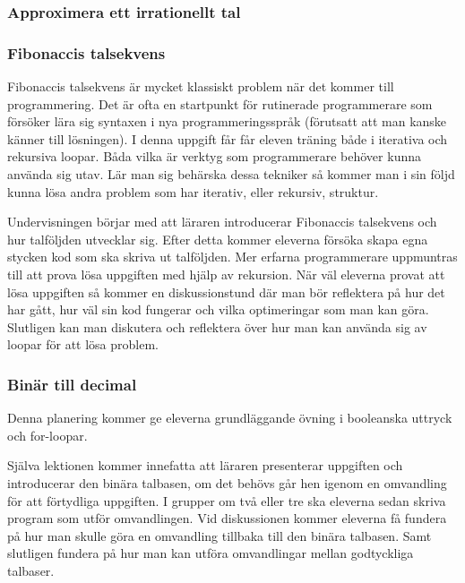         
\subsubsection{Approximera ett irrationellt tal}
    \label{sec:approx}

    
\subsubsection{Fibonaccis talsekvens}
    \label{sec:Fibonacci}
    
    \textcolor{WildStrawberry}{
        Fibonaccis talsekvens är mycket klassiskt problem när det kommer till programmering. Det är ofta en startpunkt för rutinerade programmerare som försöker lära sig syntaxen i nya programmeringsspråk (förutsatt att man kanske känner till lösningen). I denna uppgift får får eleven träning både i iterativa och rekursiva loopar. Båda vilka är verktyg som programmerare behöver kunna använda sig utav. Lär man sig behärska dessa tekniker så kommer man i sin följd kunna lösa andra problem som har iterativ, eller rekursiv, struktur. }
        
    \textcolor{WildStrawberry}{
        Undervisningen börjar med att läraren introducerar Fibonaccis talsekvens och hur talföljden utvecklar sig. Efter detta kommer eleverna försöka skapa egna stycken kod som ska skriva ut talföljden. Mer erfarna programmerare uppmuntras till att prova lösa uppgiften med hjälp av rekursion. När väl eleverna provat att lösa uppgiften så kommer en diskussionstund där man bör reflektera på hur det har gått, hur väl sin kod fungerar och vilka optimeringar som man kan göra. Slutligen kan man diskutera och reflektera över hur man kan använda sig av loopar för att lösa problem.}
        
\subsubsection{Binär till decimal}
    \label{sec:binar}
    
    \textcolor{WildStrawberry}{
        Denna planering kommer ge eleverna grundläggande övning i booleanska uttryck och for-loopar. }
    
    \textcolor{WildStrawberry}{
        Själva lektionen kommer innefatta att läraren presenterar uppgiften och introducerar den binära talbasen, om det behövs går hen igenom en omvandling för att förtydliga uppgiften. I grupper om två eller tre ska eleverna sedan skriva program som utför omvandlingen. Vid diskussionen kommer eleverna få fundera på hur man skulle göra en omvandling tillbaka till den binära talbasen. Samt slutligen fundera på hur man kan utföra omvandlingar mellan godtyckliga talbaser. }    
        
